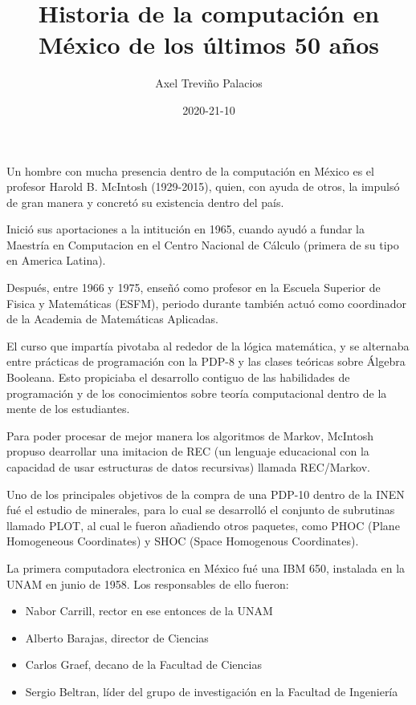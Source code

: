 \documentclass{article}
\title{Historia de la computación en México de los últimos 50 años}
\author{Axel Treviño Palacios}
\date{2020-21-10}
\begin{document}
\maketitle

Un hombre con mucha presencia dentro de la computación en México es el profesor Harold B. McIntosh (1929-2015), quien, con ayuda de otros, la impulsó de gran manera y concretó su existencia dentro del país. 

Inició sus aportaciones a la intitución en 1965, cuando ayudó a fundar la Maestría en Computacion en el Centro Nacional de Cálculo (primera de su tipo en America Latina).

Después, entre 1966 y 1975, enseñó como profesor en la Escuela Superior de Fisica y Matemáticas (ESFM), periodo durante también actuó como coordinador de la Academia de Matemáticas Aplicadas.

El curso que impartía pivotaba al rededor de la lógica matemática, y se alternaba entre prácticas de programación con la PDP-8 y las clases teóricas sobre Álgebra Booleana. Esto propiciaba el desarrollo contiguo de las habilidades de programación y de los conocimientos sobre teoría computacional dentro de la mente de los estudiantes.

Para poder procesar de mejor manera los algoritmos de Markov, McIntosh propuso dearrollar una imitacion de REC (un lenguaje educacional con la capacidad de usar estructuras de datos recursivas) llamada REC/Markov.

Uno de los principales objetivos de la compra de una PDP-10 dentro de la INEN fué el estudio de minerales, para lo cual se desarrolló el conjunto de subrutinas llamado PLOT, al cual le fueron añadiendo otros paquetes, como PHOC (Plane Homogeneous Coordinates) y SHOC (Space Homogenous Coordinates).

La primera computadora electronica en México fué una IBM 650, instalada en la UNAM en junio de 1958. Los responsables de ello fueron:

\begin{itemize}
	\item Nabor Carrill, rector en ese entonces de la UNAM
	\item Alberto Barajas, director de Ciencias
	\item Carlos Graef, decano de la Facultad de Ciencias
	\item Sergio Beltran, líder del grupo de investigación en la Facultad de Ingeniería
\end{itemize}
\end{document}
